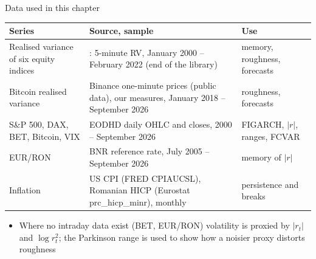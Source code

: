 \begin{frame}{Data used in this chapter}
\itemsize{\footnotesize}
\begin{center}
\scriptsize
\begin{tabular}{>{\raggedright\arraybackslash}p{3.2cm}>{\raggedright\arraybackslash}p{5.4cm}>{\raggedright\arraybackslash}p{3.6cm}}
\toprule
\textbf{Series} & \textbf{Source, sample} & \textbf{Use} \\
\midrule
Realised variance of six equity indices & : 5-minute RV, January 2000 -- February 2022 (end of the library) & memory, roughness, forecasts \\
Bitcoin realised variance & Binance one-minute prices (public data), our measures, January 2018 -- September 2026 & roughness, forecasts \\
S\&P 500, DAX, BET, Bitcoin, VIX & EODHD daily OHLC and closes, 2000 -- September 2026 & FIGARCH, $|r|$, ranges, FCVAR \\
EUR/RON & BNR reference rate, July 2005 -- September 2026 & memory of $|r|$ \\
Inflation & US CPI (FRED CPIAUCSL), Romanian HICP (Eurostat prc\_hicp\_minr), monthly & persistence and breaks \\
\bottomrule
\end{tabular}
\end{center}
\begin{itemize}
    \item Where no intraday data exist (BET, EUR/RON) volatility is proxied by $|r_t|$ and $\log r_t^2$; the Parkinson range is used to show how a noisier proxy distorts roughness
\end{itemize}
\end{frame}

